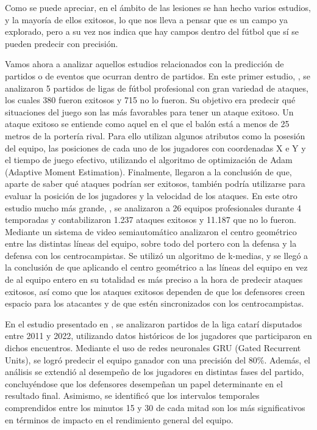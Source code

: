 Como se puede apreciar, en el ámbito de las lesiones se han hecho varios estudios, y la mayoría de ellos exitosos, lo que nos lleva a pensar que es un campo ya explorado, pero a su vez nos indica que hay campos dentro del fútbol que sí se pueden predecir con precisión.

Vamos ahora a analizar aquellos estudios relacionados con la predicción de partidos o de eventos que ocurran dentro de partidos. En este primer estudio, \cite{first-outcome}, se analizaron 5 partidos de ligas de fútbol profesional con gran variedad de ataques, los cuales 380 fueron exitosos y 715 no lo fueron. Su objetivo era predecir qué situaciones del juego son las más favorables para tener un ataque exitoso. Un ataque exitoso se entiende como aquel en el que el balón está a menos de 25 metros de la portería rival. Para ello utilizan algunos atributos como la posesión del equipo, las posiciones de cada uno de los jugadores con coordenadas X e Y y el tiempo de juego efectivo, utilizando el algoritmo de optimización de Adam (Adaptive Moment Estimation). Finalmente, llegaron a la conclusión de que, aparte de saber qué ataques podrían ser exitosos, también podría utilizarse para evaluar la posición de los jugadores y la velocidad de los ataques. En este otro estudio mucho más grande, \cite{second-outcome}, se analizaron a 26 equipos profesionales durante 4 temporadas y contabilizaron 1.237 ataques exitosos y  11.187 que no lo fueron. Mediante un sistema de video semiautomático analizaron el centro geométrico entre las distintas líneas del equipo, sobre todo del portero con la defensa y la defensa con los centrocampistas. Se utilizó un algoritmo de k-medias, y se llegó a la conclusión de que aplicando el centro geométrico a las líneas del equipo en vez de al equipo entero en su totalidad es más preciso a la hora de predecir ataques exitosos, así como que los ataques exitosos dependen de que los defensores creen espacio para los atacantes y de que estén sincronizados con los centrocampistas.

En el estudio presentado en \cite{third-outcome}, se analizaron partidos de la liga catarí disputados entre 2011 y 2022, utilizando datos históricos de los jugadores que participaron en dichos encuentros. Mediante el uso de redes neuronales GRU (Gated Recurrent Units), se logró predecir el equipo ganador con una precisión del 80\%. Además, el análisis se extendió al desempeño de los jugadores en distintas fases del partido, concluyéndose que los defensores desempeñan un papel determinante en el resultado final. Asimismo, se identificó que los intervalos temporales comprendidos entre los minutos 15 y 30 de cada mitad son los más significativos en términos de impacto en el rendimiento general del equipo.

